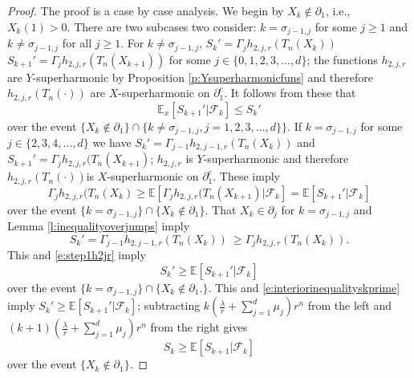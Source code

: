 \documentclass[10pt,a4paper]{amsart}
\begin{document}
\begin{proof}
The proof is a case by case analysis. We begin by $X_k \notin \partial_1$,
i.e., $X_k(1) > 0.$ There are two subcases two consider:
$k = \sigma_{j-1,j}$ for some $j \ge 1$ and 
$k \neq \sigma_{j-1,j}$ for all $j \ge 1$.
For 
$k \neq \sigma_{j-1,j}$, 
$S_k' = \Gamma_j h_{2,j,r}(T_n(X_k))$ 
$S_{k+1}' = \Gamma_j h_{2,j,r}(T_n(X_{k+1}))$ 
for some $j \in \{0,1,2,3,...,d\}$;
the functions $h_{2,j,r}$ are $Y$-superharmonic by Proposition
\ref{p:Ysuperharmonicfuns} and therefore 
$h_{2,j,r}(T_n(\cdot))$ are $X$-superharmonic on $\partial_1^c.$
It follows from these that
\begin{equation}\label{e:interiorinequalityskprime}
{\mathbb E}_x[S_{k+1}' | {\mathscr F}_k] \le S_k'
\end{equation}
over the event 
$\{ X_k \notin \partial_1\} \cap \{k \neq \sigma_{j-1,j}, j=1,2,3,...,d\}\}.$
If $k = \sigma_{j-1,j}$ for some $j \in \{2,3,4,...,d\}$ we have
$S_k' = \Gamma_{j-1}h_{2,j-1,r}(T_n(X_k))$
and $S_{k+1}' = \Gamma_j h_{2,j,r}(T_n(X_{k+1})$; $h_{2,j,r}$  is $Y$-superharmonic
and therefore $h_{2,j,r}(T_n(\cdot))$is $X$-superharmonic on $\partial_1^c$.
These imply
\begin{equation}\label{e:step1h2jr}
\Gamma_j h_{2,j,r}(T_n(X_{k}) \ge
{\mathbb E}[\Gamma_j h_{2,j,r}(T_n(X_{k+1}) |{\mathscr F}_k] =
{\mathbb E}[S_{k+1}' |{\mathscr F}_k] 
\end{equation}
over the event $\{k = \sigma_{j-1,j}\} \cap \{ X_k \notin \partial_1\}.$
That $X_{k} \in \partial_j$ for $k=\sigma_{j-1,j}$
and Lemma \ref{l:inequalityoverjumps}
imply
\[
S_{k}'=\Gamma_{j-1} h_{2,j-1,r}(T_n(X_{k}))\ 
\ge \Gamma_j h_{2,j,r}(T_n(X_k)).
\]
This and \eqref{e:step1h2jr} imply
\[
S_k' \ge {\mathbb E}[S_{k+1}' |{\mathscr F}_k] 
\]
over the event $\{k = \sigma_{j-1,j}\} \cap \{ X_k \notin \partial_1.\}.$
This and \eqref{e:interiorinequalityskprime} imply
$S_k' \ge {\mathbb E}[S_{k+1}' |{\mathscr F}_k]$;
subtracting 
$k\left( \frac{\lambda}{r} + \sum_{j=1}^d \mu_j \right) r^n$
from the left and 
$(k+1)\left( \frac{\lambda}{r} + \sum_{j=1}^d \mu_j \right) r^n$
from the right gives
\[
S_k \ge {\mathbb E}[S_{k+1} |{\mathscr F}_k] 
\]
over the event $\{X_k \notin \partial_1\}$. 


\end{proof}
\end{document}
